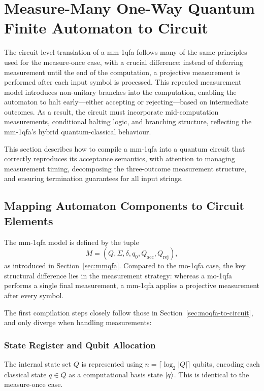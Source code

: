 \section{Measure-Many One-Way Quantum Finite Automaton to Circuit}
\label{sec:mmqfa-to-circuit}


The circuit-level translation of a \gls{mm-1qfa} follows many of the same principles used for the measure-once case, with a crucial difference: instead of deferring measurement until the end of the computation, a projective measurement is performed after each input symbol is processed. This repeated measurement model introduces non-unitary branches into the computation, enabling the automaton to halt early—either accepting or rejecting—based on intermediate outcomes. As a result, the circuit must incorporate mid-computation measurements, conditional halting logic, and branching structure, reflecting the \gls{mm-1qfa}'s hybrid quantum-classical behaviour.

This section describes how to compile a \gls{mm-1qfa} into a quantum circuit that correctly reproduces its acceptance semantics, with attention to managing measurement timing, decomposing the three-outcome measurement structure, and ensuring termination guarantees for all input strings.

\subsection{Mapping Automaton Components to Circuit Elements}
\label{sec:mmqfa-mapping}

The \gls{mm-1qfa} model is defined by the tuple
\[
M = (Q, \Sigma, \delta, q_0, Q_{\text{acc}}, Q_{\text{rej}}),
\]
as introduced in Section~\ref{sec:mmqfa}. Compared to the \gls{mo-1qfa} case, the key structural difference lies in the measurement strategy: whereas a \gls{mo-1qfa} performs a single final measurement, a \gls{mm-1qfa} applies a projective measurement after every symbol.

The first compilation steps closely follow those in Section~\ref{sec:moqfa-to-circuit}, and only diverge when handling measurements:

\subsubsection*{State Register and Qubit Allocation}
The internal state set $Q$ is represented using $n = \lceil \log_2 |Q| \rceil$ qubits, encoding each classical state $q \in Q$ as a computational basis state $\ket{q}$. This is identical to the measure-once case.

